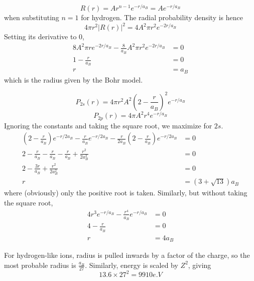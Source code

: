 \documentclass[answers]{exam}
\begin{document}
\begin{questions}

\begin{solution}
	$$R(r) = Ar^{n-1}e^{-r/a_B} = Ae^{-r/a_B}$$
	when substituting $n=1$ for hydrogen. The radial probability density is hence
	$$4\pi r^2|R(r)|^2 = 4A^2\pi r^2e^{-2r/a_B}$$
	Setting its derivative to 0,
	\begin{align*}
		8A^2\pi re^{-2r/a_B} - \frac{8}{a_B}A^2\pi r^2e^{-2r/a_B} &= 0 \\
		1 - \frac{r}{a_B} &= 0 \\
		r &= a_B
	\end{align*}
	which is the radius given by the Bohr model.
\end{solution}


\begin{solution}
	$$P_{2s}(r) = 4\pi r^2 A^2\left(2-\frac{r}{a_B}\right)^2 e^{-r/a_B}$$
	$$P_{2p}(r) = 4\pi A^2r^4e^{-r/a_B}$$
	Ignoring the constants and taking the square root, we maximize for $2s$.
	\begin{align*}
		\left(2-\frac{r}{a_B}\right)e^{-r/2a_B} - \frac{r}{a_B} e^{-r/2a_B} - \frac{r}{2a_B}\left(2-\frac{r}{a_B}\right) e^{-r/2a_B} &= 0 \\
		2-\frac{r}{a_B} - \frac{r}{a_B} - \frac{r}{a_B} + \frac{r^2}{2a^2_B} &= 0 \\
		2 - \frac{3r}{a_B} + \frac{r^2}{2a^2_B} &= 0 \\
		r &= (3+\sqrt{13})a_B
	\end{align*}
	where (obviously) only the positive root is taken. Similarly, but without taking the square root,
	\begin{align*}
		4r^3e^{-r/a_B} - \frac{r^4}{a_B}e^{-r/a_B} &= 0 \\
		4 - \frac{r}{a_B} &= 0 \\
		r &= 4a_B
	\end{align*}
\end{solution}


\begin{solution}
	For hydrogen-like ions, radius is pulled inwards by a factor of the charge, so the most probable radius is $\frac{a_B}{27}$. Similarly, energy is scaled by $Z^2$, giving
	$$13.6 \times 27^2 = 9910\unit{e.V}$$
\end{solution}
\end{questions}
\end{document}
